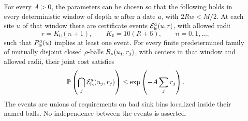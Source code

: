 \begin{proposition}\label{prop:joint-witness}
For every \(A>0\), the parameters can be chosen so that the following
holds in every deterministic window of depth \(w\) after a date
\(a\), with \(2Rw<M/2\). At each site \(u\) of that window
there are certificate events \(\mathcal E_{\rm ls}^a(u,r)\),
with allowed radii
\[
 r=K_0(n+1),\qquad K_0=10(R+6),\qquad n=0,1,\ldots ,
\]
such that \(P_{\rm ls}^a(u)\) implies at least one event.
For every finite predetermined family of mutually disjoint closed
\(\rho\)-balls \(\mathcal B_\rho(u_j,r_j)\), with centers in that window
and allowed radii, their joint cost satisfies
\begin{equation}\label{eq:joint-witness}
 \mathbb P\left(\bigcap_j\mathcal E_{\rm ls}^a(u_j,r_j)\right)
      \le \exp\left(-A\sum_jr_j\right).
\end{equation}
The events are unions of requirements on bad sink bins localized
inside their named balls. No independence between the events is
asserted.
\end{proposition}

